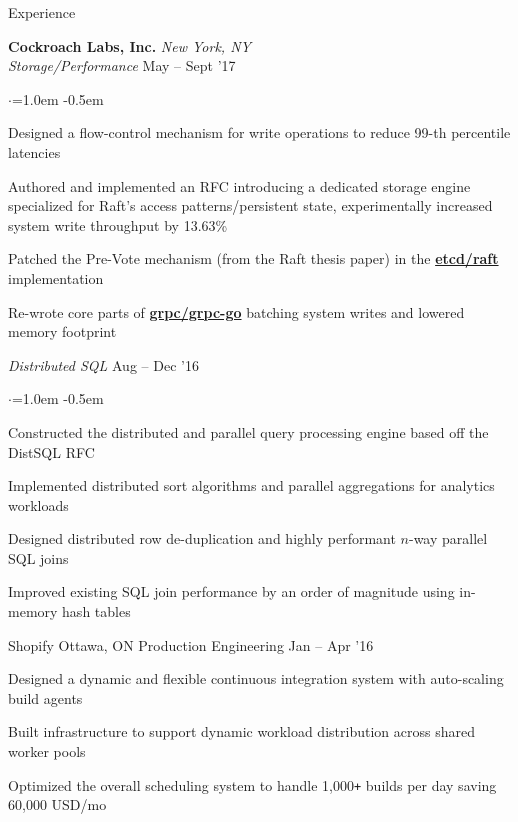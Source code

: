 \documentclass{resume} %
\begin{document}
\begin{rSection}{Experience}


  {\bf Cockroach Labs, Inc.}  \hfill  {\em New York, NY}
  \\
  {\em Storage/Performance}  \hfill  {May -- Sept '17}
  \smallskip
  \begin{list}{$\cdot$}{\leftmargin=1.0em}
  \itemsep -0.5em \vspace{-0.5em}
    \item Designed a flow-control mechanism for write operations to reduce 99-th
      percentile latencies
    \item Authored and implemented an RFC introducing a dedicated storage engine
      specialized for Raft's access patterns/persistent state, experimentally
      increased system write throughput by 13.63\%
    \item Patched the Pre-Vote mechanism (from the Raft thesis paper) in the
      \href{https://github.com/coreos/etcd/pull/8288}{\textbf{etcd/raft}}
      implementation
    \item Re-wrote core parts of
      \href{https://github.com/grpc/grpc-go}{\textbf{grpc/grpc-go}} batching
      system writes and lowered memory footprint

  \end{list}
  {\em Distributed SQL}  \hfill  {Aug -- Dec '16}
  \smallskip
  \begin{list}{$\cdot$}{\leftmargin=1.0em}
  \itemsep -0.5em \vspace{-0.5em}
    \item Constructed the distributed and parallel query processing engine
      based off the DistSQL RFC
    \item Implemented distributed sort algorithms and parallel aggregations for
      analytics workloads
    \item Designed distributed row de-duplication and highly performant $n$-way
      parallel SQL joins
    \item Improved existing SQL join performance by an order of magnitude using
      in-memory hash tables
  \end{list}
  \vspace{0.5em}

  \begin{rSubsection}{Shopify}
                     {Ottawa, ON}
                     {Production Engineering}
                     {Jan -- Apr '16}

  \item Designed a dynamic and flexible continuous integration system with
    auto-scaling build agents
  \item Built infrastructure to support dynamic workload distribution across
    shared worker pools
  \item Optimized the overall scheduling system to handle 1,000\texttt{+} builds per
    day saving 60,000 USD/mo
  \end{rSubsection}


\end{rSection}
\end{document}

